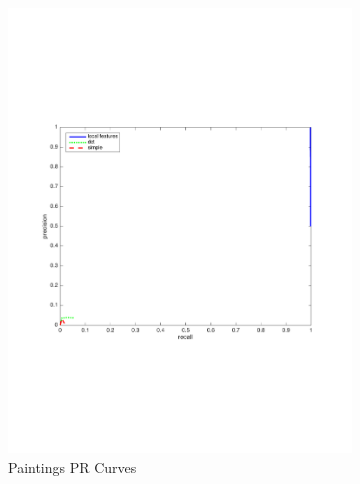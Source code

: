 \documentclass[english,12pt,a4paper,pdftex,elec,utf8, table]{aaltothesis}
\begin{document}
\begin{figure}[htb]
\begin{center}
\begin{subfigure}[b]{0.49\textwidth}
    \includegraphics[width=\textwidth]{figures/Border10PR.pdf}
    \caption{Paintings PR Curves}
    \label{Borderrocthinglink}
  \end{subfigure}
  \begin{subfigure}[b]{0.49\textwidth}

\end{subfigure}
\end{center}
\end{figure}
\end{document}
